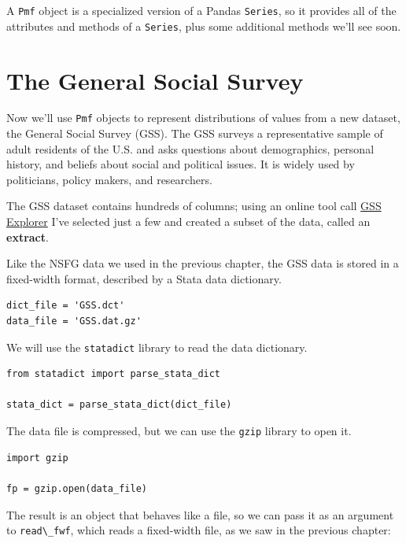A \passthrough{\lstinline!Pmf!} object is a specialized version of a
Pandas \passthrough{\lstinline!Series!}, so it provides all of the
attributes and methods of a \passthrough{\lstinline!Series!}, plus some
additional methods we'll see soon.

\hypertarget{the-general-social-survey}{%
\section{The General Social Survey}\label{the-general-social-survey}}

Now we'll use \passthrough{\lstinline!Pmf!} objects to represent
distributions of values from a new dataset, the General Social Survey
(GSS). The GSS surveys a representative sample of adult residents of the
U.S. and asks questions about demographics, personal history, and
beliefs about social and political issues. It is widely used by
politicians, policy makers, and researchers.

The GSS dataset contains hundreds of columns; using an online tool call
\href{https://gssdataexplorer.norc.org/}{GSS Explorer} I've selected
just a few and created a subset of the data, called an \textbf{extract}.

Like the NSFG data we used in the previous chapter, the GSS data is
stored in a fixed-width format, described by a Stata data dictionary.

\begin{lstlisting}[]
dict_file = 'GSS.dct'
data_file = 'GSS.dat.gz'
\end{lstlisting}

We will use the \passthrough{\lstinline!statadict!} library to read the
data dictionary.

\begin{lstlisting}[]
from statadict import parse_stata_dict

stata_dict = parse_stata_dict(dict_file)
\end{lstlisting}

The data file is compressed, but we can use the
\passthrough{\lstinline!gzip!} library to open it.

\begin{lstlisting}[]
import gzip

fp = gzip.open(data_file)
\end{lstlisting}

The result is an object that behaves like a file, so we can pass it as
an argument to \passthrough{\lstinline!read\_fwf!}, which reads a
fixed-width file, as we saw in the previous chapter:

